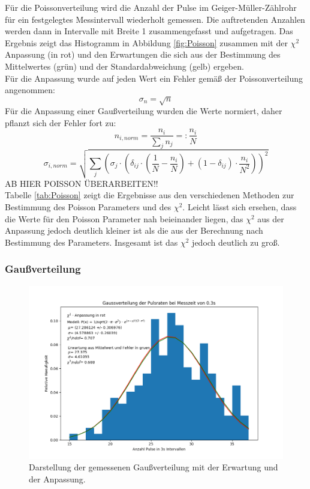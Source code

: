 \documentclass[12pt,a4paper]{article}
\begin{document}
Für die Poissonverteilung wird die Anzahl der Pulse im Geiger-Müller-Zählrohr für ein festgelegtes Messintervall wiederholt gemessen. Die auftretenden Anzahlen werden dann in Intervalle mit Breite 1 zusammengefasst und aufgetragen. Das Ergebnis zeigt das Histogramm in Abbildung \ref{fig:Poisson} zusammen mit der $\chi ^2$ Anpassung (in rot) und den Erwartungen die sich aus der Bestimmung des Mittelwertes (grün) und der Standardabweichung (gelb) ergeben.\\
Für die Anpassung wurde auf jeden Wert ein Fehler gemäß der Poissonverteilung angenommen:
\begin{equation*}
\sigma _{n} = \sqrt{n}
\end{equation*}
Für die Anpassung einer Gaußverteilung wurden die Werte normiert, daher pflanzt sich der Fehler fort zu:
\begin{equation*}
n_{i, norm} = \dfrac{n_i}{\sum _j n_j} =: \dfrac{n_i}{N}
\end{equation*}
\begin{equation*}
\sigma _{i, norm} = \sqrt{ \sum _j \left( \sigma_j \cdot \left( \delta_{ij} \cdot \left( \frac{1}{N} - \frac{n_i}{N} \right) + (1 - \delta_{ij}) \cdot \frac{n_i}{N^2} \right) \right)^2 }
\end{equation*}
AB HIER POISSON ÜBERARBEITEN!! \\
Tabelle \ref{tab:Poisson} zeigt die Ergebnisse aus den verschiedenen Methoden zur Bestimmung des Poisson Parameters und des $\chi ^2$. Leicht lässt sich ersehen, dass die Werte für den Poisson Parameter nah beieinander liegen, das $\chi ^2$ aus der Anpassung jedoch deutlich kleiner ist als die aus der Berechnung nach Bestimmung des Parameters. Insgesamt ist das $\chi ^2$ jedoch deutlich zu groß. 


\subsubsection{Gaußverteilung}
\begin{figure}
\centering
\includegraphics[scale=0.8]{Bilder/gauss.PNG}
\caption{Darstellung der gemessenen Gaußverteilung mit der Erwartung und der Anpassung.}
\label{fig:gauss}
\end{figure}
\end{document}
